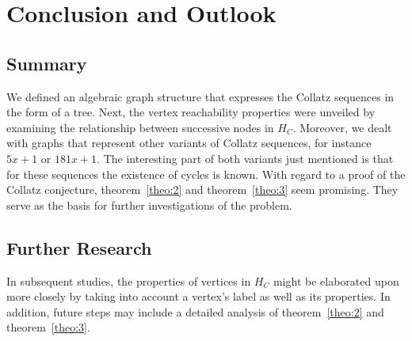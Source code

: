 \chapter{Conclusion and Outlook}

\section{Summary}
We defined an algebraic graph structure that expresses the Collatz sequences in the form of a tree. Next, the vertex reachability properties were unveiled by examining the relationship between successive nodes in $H_C$. Moreover, we dealt with graphs that represent other variants of Collatz sequences, for instance $5x+1$ or $181x+1$. The interesting part of both variants just mentioned is that for these sequences the existence of cycles is known. With regard to a proof of the Collatz conjecture, theorem~\ref{theo:2} and theorem~\ref{theo:3} seem promising. They serve as the basis for further investigations of the problem.

\section{Further Research}
In subsequent studies, the properties of vertices in $H_C$ might be elaborated upon more closely by taking into account a vertex's label as well as its properties. In addition, future steps may include a detailed analysis of theorem~\ref{theo:2} and theorem~\ref{theo:3}.